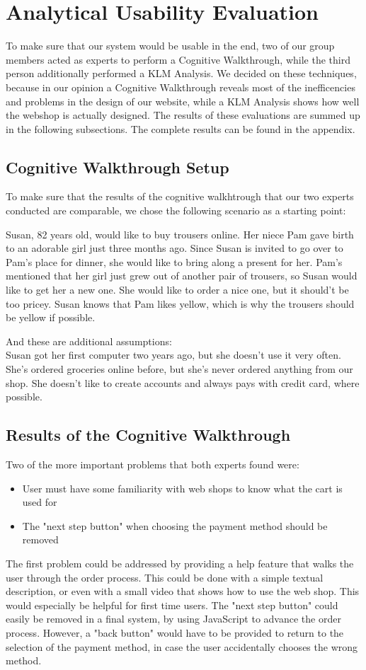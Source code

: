 \section{Analytical Usability Evaluation}
To make sure that our system would be usable in the end, two of our group members acted as experts to perform a Cognitive Walkthrough, while the third person additionally performed a KLM Analysis. We decided on these techniques, because in our opinion a Cognitive Walkthrough reveals most of the inefficencies and problems in the design of our website, while a KLM Analysis shows how well the webshop is actually designed.
The results of these evaluations are summed up in the following subsections. The complete results can be found in the appendix.

\subsection{Cognitive Walkthrough Setup}
To make sure that the results of the cognitive walkhtrough that our two experts conducted are comparable, we chose the following scenario as a starting point:

Susan, 82 years old, would like to buy trousers online. Her niece Pam gave birth to an adorable girl just three months ago. Since Susan is invited to go over to Pam's place for dinner, she would like to bring along a present for her. Pam's mentioned that her girl just grew out of another pair of trousers, so Susan would like to get her a new one. She would like to order a nice one, but it should't be too pricey. Susan knows that Pam likes yellow, which is why the trousers should be yellow if possible.

And these are additional assumptions:\\
Susan got her first computer two years ago, but she doesn't use it very often. She's ordered groceries online before, but she's never ordered anything from our shop. She doesn't like to create accounts and always pays with credit card, where possible.

\subsection{Results of the Cognitive Walkthrough}
Two of the more important problems that both experts found were:
\begin{itemize}\addtolength{\itemsep}{-0.5\baselineskip}
	\item User must have some familiarity with web shops to know what the cart is used for
	\item The "next step button" when choosing the payment method should be removed
\end{itemize}
The first problem could be addressed by providing a help feature that walks the user through the order process. This could be done with a simple textual description, or even with a small video that shows how to use the web shop. This would especially be helpful for first time users.
The "next step button" could easily be removed in a final system, by using JavaScript to advance the order process. However, a "back button" would have to be provided to return to the selection of the payment method, in case the user accidentally chooses the wrong method.

